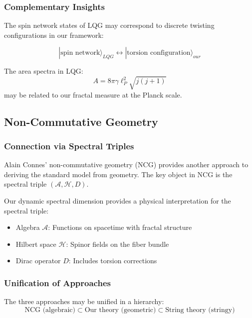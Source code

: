 \subsubsection{Complementary Insights}

The spin network states of LQG may correspond to discrete twisting configurations in our framework:

\begin{equation}
    |\text{spin network}\rangle_{LQG} \longleftrightarrow |\text{torsion configuration}\rangle_{our}
\end{equation}

The area spectra in LQG:
\begin{equation}
    A = 8\pi\gamma\ell_P^2 \sqrt{j(j+1)}
\end{equation}
may be related to our fractal measure at the Planck scale.

\subsection{Non-Commutative Geometry}

\subsubsection{Connection via Spectral Triples}

Alain Connes' non-commutative geometry (NCG) provides another approach to deriving the standard model from geometry. The key object in NCG is the spectral triple $(\mathcal{A}, \mathcal{H}, D)$.

Our dynamic spectral dimension provides a physical interpretation for the spectral triple:
\begin{itemize}
    \item Algebra $\mathcal{A}$: Functions on spacetime with fractal structure
    \item Hilbert space $\mathcal{H}$: Spinor fields on the fiber bundle
    \item Dirac operator $D$: Includes torsion corrections
\end{itemize}

\subsubsection{Unification of Approaches}

The three approaches may be unified in a hierarchy:
\begin{equation}
    \text{NCG (algebraic)} \subset \text{Our theory (geometric)} \subset \text{String theory (stringy)}
\end{equation}

